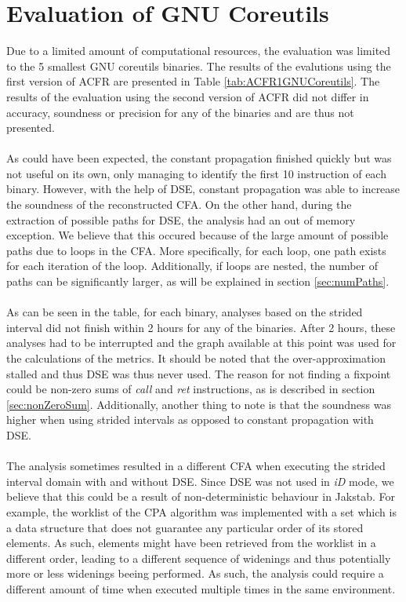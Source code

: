 \documentclass{kththesis}
\renewcommand{\it}[1]{\textit{#1}}
\begin{document}
\section{Evaluation of GNU Coreutils}\label{sec:evalGNU}
Due to a limited amount of computational resources, the evaluation was limited to the 5 smallest GNU coreutils binaries. The results of the evalutions using the first version of ACFR are presented in Table \ref{tab:ACFR1GNUCoreutils}. The results of the evaluation using the second version of ACFR did not differ in accuracy, soundness or precision for any of the binaries and are thus not presented.
\\ \\
As could have been expected, the constant propagation finished quickly but was not useful on its own, only managing to identify the first 10 instruction of each binary. However, with the help of DSE, constant propagation was able to increase the soundness of the reconstructed CFA. On the other hand, during the extraction of possible paths for DSE, the analysis had an out of memory exception. We believe that this occured because of the large amount of possible paths due to loops in the CFA. More specifically, for each loop, one path exists for each iteration of the loop. Additionally, if loops are nested, the number of paths can be significantly larger, as will be explained in section \ref{sec:numPaths}.
\\ \\
As can be seen in the table, for each binary, analyses based on the strided interval did not finish within 2 hours for any of the binaries. After 2 hours, these analyses had to be interrupted and the graph available at this point was used for the calculations of the metrics. It should be noted that the over-approximation stalled and thus DSE was thus never used. The reason for not finding a fixpoint could be non-zero sums of \it{call} and \it{ret} instructions, as is described in section \ref{sec:nonZeroSum}. Additionally, another thing to note is that the soundness was higher when using strided intervals as opposed to constant propagation with DSE. 
\\ \\
The analysis sometimes resulted in a different CFA when executing the strided interval domain with and without DSE. Since DSE was not used in \it{iD} mode, we believe that this could be a result of non-deterministic behaviour in Jakstab. For example, the worklist of the CPA algorithm was implemented with a set which is a data structure that does not guarantee any particular order of its stored elements. As such, elements might have been retrieved from the worklist in a different order, leading to a different sequence of widenings and thus potentially more or less widenings beeing performed. As such, the analysis could require a different amount of time when executed multiple times in the same environment. 
\end{document}
